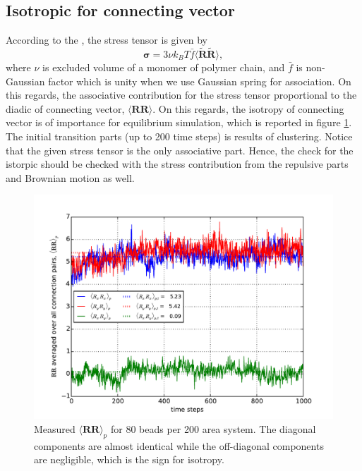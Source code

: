 \message{ !name(brief_Brownian_dynamics.tex)}\documentclass[10pt, a4paper]{report}
\begin{document}

\subsection{Isotropic for connecting vector}
According to the \textcite{Ianniruberto:2015dv}, the stress tensor is given by
\begin{equation}
\boldsymbol{\sigma} = 3\nu k_BT\bar{f}\langle\mathbf{\tilde{R}\tilde{R}}\rangle,
\end{equation}
where $\nu$ is excluded volume of a monomer of polymer chain, and $\bar{f}$ is non-Gaussian factor which is unity when we use Gaussian spring for association. On this regards, the associative contribution for the stress tensor proportional to the diadic of connecting vector, $\langle\mathbf{RR} \rangle$. On this regards, the isotropy of connecting vector is of importance for equilibrium simulation, which is reported in figure \ref{fig:RR_isotropy}. The initial transition parts (up to 200 time steps) is results of clustering. Notice that the given stress tensor is the only associative part. Hence, the check for the istorpic should be checked with the stress contribution from the repulsive parts and Brownian motion as well.

\begin{figure}
  \centering
  \includegraphics[width=\textwidth]{figures/RR_NP80_C100_T3.pdf}
  \caption{Measured $\langle \mathbf{RR}\rangle_p$ for 80 beads per 200 area system. The diagonal components are almost identical while the off-diagonal components are negligible, which is the sign for isotropy.}
  \label{fig:RR_isotropy}
\end{figure}
\end{document}
